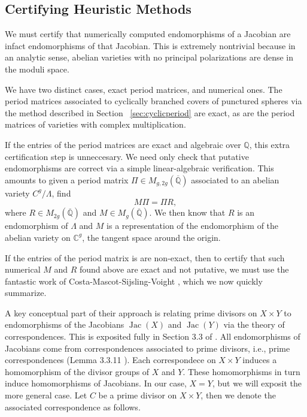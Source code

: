 \documentclass[12pt,reqno]{amsart}
\DeclareMathOperator{\Jac}{Jac}
\newcommand{\C}{\mathbb{C}}
\newcommand{\Q}{\mathbb{Q}}
\theoremstyle{definition}
\theoremstyle{remark}
\begin{document}
\subsection{Certifying Heuristic Methods}
\label{sec:cert}

We must certify that numerically computed endomorphisms of a Jacobian are infact endomorphisms of that Jacobian. This is extremely nontrivial because in an analytic sense, abelian varieties with no principal polarizations are dense in the moduli space. 

We have two distinct cases, exact period matrices, and numerical ones. The period matrices associated to cyclically branched covers of punctured spheres via the method described in Section ~\ref{sec:cyclicperiod} are exact, as are the period matrices of varieties with complex multiplication. 

If the entries of the period matrices are exact and algebraic over $\Q$, this extra certification step is unneccesary. We need only check that putative endomorphisms are correct via a simple linear-algebraic verification. This amounts to given a period matrix $\Pi \in M_{g, 2g}(\overline{\Q})$ associated to an abelian variety $C^g/\Lambda$, find
$$M \Pi = \Pi R,$$
where $R \in  M_{2g}(\overline{\Q})$ and $M \in M_{g}(\overline{\Q})$. We then know that $R$ is an endomorphism of $\Lambda$ and $M$ is a representation of the endomorphism of the abelian variety on $\C^g$, the tangent space around the origin.

If the entries of the period matrix is are non-exact, then to certify that such numerical $M$ and $R$ found above are exact and not putative, we must use the fantastic work of Costa-Mascot-Sijsling-Voight \cite{rigor}, which we now quickly summarize.

A key conceptual part of their approach is relating prime divisors on $X \times Y$ to endomorphisms of the Jacobians $\Jac(X)$ and $\Jac(Y)$ via the theory of correspondences. This is exposited fully in Section 3.3 of \cite{smith}. All endomorphisms of Jacobians come from correspondences associated to prime divisors, i.e., prime correspondences (Lemma 3.3.11 \cite{smith}). Each correspondece on $X \times Y$ induces a homomorphism of the divisor groups of $X$ and $Y$. These homomorphisms in turn induce homomorphisms of Jacobians. In our case, $X=Y$, but we will exposit the more general case. Let $C$ be a prime divisor on $X \times Y$, then we denote the associated correspondence as follows.

\begin{center}
\end{center}
\end{document}
